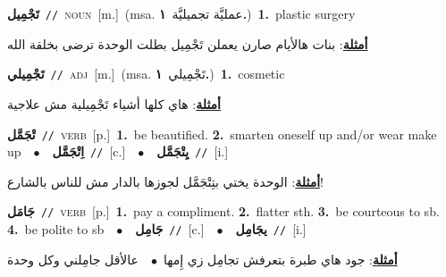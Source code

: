 \documentclass[10pt,a4paper,twoside]{article} %
\begin{document}
\begin{multicols}{2}
{\setlength\topsep{0pt}\textbf{\foreignlanguage{arabic}{تَجْمِيل}}\ {\color{gray}\texttt{//}\color{black}}\ \textsc{noun}\ [m.]\ \color{gray}(msa. \foreignlanguage{arabic}{عمليَّة تجميليَّة}~\foreignlanguage{arabic}{\textbf{١.}})\color{black}\ \textbf{1.}~plastic surgery\  \begin{flushright}\color{gray}\foreignlanguage{arabic}{\textbf{\underline{\foreignlanguage{arabic}{أمثلة}}}: بنات هالأيام صارن يعملن تَجْمِيل بطلت الوحدة ترضى بخلقة الله}\end{flushright}\color{black}} \vspace{2mm}

{\setlength\topsep{0pt}\textbf{\foreignlanguage{arabic}{تَجْمِيلي}}\ {\color{gray}\texttt{//}\color{black}}\ \textsc{adj}\ [m.]\ \color{gray}(msa. \foreignlanguage{arabic}{تَجْمِيلي}~\foreignlanguage{arabic}{\textbf{١.}})\color{black}\ \textbf{1.}~cosmetic\  \begin{flushright}\color{gray}\foreignlanguage{arabic}{\textbf{\underline{\foreignlanguage{arabic}{أمثلة}}}: هاي كلها أشياء تَجْمِيلية مش علاجية}\end{flushright}\color{black}} \vspace{2mm}

{\setlength\topsep{0pt}\textbf{\foreignlanguage{arabic}{تْجَمَّل}}\ {\color{gray}\texttt{//}\color{black}}\ \textsc{verb}\ [p.]\ \textbf{1.}~be beautified.  \textbf{2.}~smarten oneself up and/or wear make up\ \ $\bullet$\ \ \setlength\topsep{0pt}\textbf{\foreignlanguage{arabic}{اِتْجَمَّل}}\ {\color{gray}\texttt{//}\color{black}}\ [c.]\ \ $\bullet$\ \ \setlength\topsep{0pt}\textbf{\foreignlanguage{arabic}{يِتْجَمَّل}}\ {\color{gray}\texttt{//}\color{black}}\ [i.]\  \begin{flushright}\color{gray}\foreignlanguage{arabic}{\textbf{\underline{\foreignlanguage{arabic}{أمثلة}}}: الوحدة يختي بتِتْجَمَّل لجوزها بالدار مش للناس بالشارع!}\end{flushright}\color{black}} \vspace{2mm}

{\setlength\topsep{0pt}\textbf{\foreignlanguage{arabic}{جَامَل}}\ {\color{gray}\texttt{//}\color{black}}\ \textsc{verb}\ [p.]\ \textbf{1.}~pay a compliment.  \textbf{2.}~flatter sth.  \textbf{3.}~be courteous to sb.  \textbf{4.}~be polite to sb\ \ $\bullet$\ \ \setlength\topsep{0pt}\textbf{\foreignlanguage{arabic}{جَامِل}}\ {\color{gray}\texttt{//}\color{black}}\ [c.]\ \ $\bullet$\ \ \setlength\topsep{0pt}\textbf{\foreignlanguage{arabic}{يجَامِل}}\ {\color{gray}\texttt{//}\color{black}}\ [i.]\  \begin{flushright}\color{gray}\foreignlanguage{arabic}{\textbf{\underline{\foreignlanguage{arabic}{أمثلة}}}: جود هاي طبرة بتعرفش تجامِل زي إِمها\ $\bullet$\ \  عالأقل جامِلني وكل وحدة}\end{flushright}\color{black}} \vspace{2mm}


\end{multicols}
\end{document}
